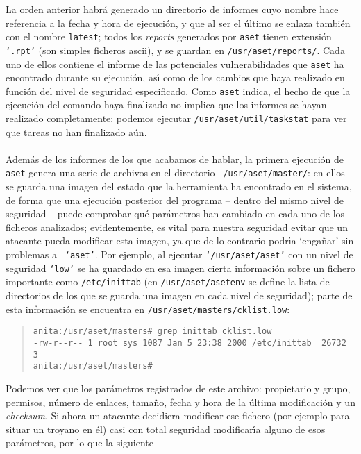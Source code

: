 La orden anterior habr\'a generado un directorio de informes cuyo nombre hace 
referencia a la fecha y hora de ejecuci\'on, y que al ser el \'ultimo se enlaza 
tambi\'en con el nombre {\tt latest}; todos los {\it reports} generados por 
{\tt aset} tienen extensi\'on {\tt `.rpt'} (son simples ficheros {\sc ascii}), 
y se guardan en {\tt /usr/aset/reports/}. Cada uno de ellos contiene el informe 
de las potenciales 
vulnerabilidades que {\tt aset} ha encontrado durante su ejecuci\'on, as\'{\i}
como de los cambios que haya realizado en funci\'on del nivel de seguridad
especificado. Como {\tt aset} indica, el hecho de que la ejecuci\'on del comando
haya finalizado no implica que los informes se hayan realizado completamente;
podemos ejecutar {\tt /usr/aset/util/taskstat} para ver que tareas no han
finalizado a\'un.\\
\\Adem\'as de los informes de los que acabamos de hablar, la primera 
ejecuci\'on de {\tt aset} genera una serie de archivos en el directorio {\tt 
/usr/aset/master/}: en ellos se guarda una imagen del estado que la herramienta
ha encontrado en el sistema, de forma que una ejecuci\'on posterior del 
programa -- dentro del mismo nivel de seguridad -- puede comprobar qu\'e 
par\'ametros han cambiado en cada uno de los ficheros analizados; evidentemente,
es vital para nuestra seguridad evitar que un atacante pueda modificar esta
imagen, ya que de lo contrario podr\'{\i}a `enga\~nar' sin problemas a {\tt 
`aset'}. Por ejemplo,
al ejecutar {\tt `/usr/aset/aset'} con un nivel de seguridad {\tt `low'} se ha 
guardado en esa i\-ma\-gen cierta informaci\'on sobre un fichero importante 
como {\tt /etc/inittab} (en {\tt /usr/aset/asetenv} se define la lista de 
directorios de los que se guarda una imagen en cada nivel de seguridad); parte 
de esta informaci\'on se encuentra en {\tt /usr/aset/masters/cklist.low}:
\begin{quote}
\begin{verbatim}
anita:/usr/aset/masters# grep inittab cklist.low 
-rw-r--r-- 1 root sys 1087 Jan 5 23:38 2000 /etc/inittab  26732 3
anita:/usr/aset/masters# 
\end{verbatim}
\end{quote}
Podemos ver que los par\'ametros registrados de este archivo: propietario y
grupo, permisos, n\'umero de enlaces, tama\~no, fecha y hora de la \'ultima
modificaci\'on y un {\it checksum}. Si ahora un atacante decidiera modificar 
ese fichero (por ejemplo para situar un troyano en \'el) casi con total 
seguridad modificar\'{\i}a alguno de esos par\'ametros, por lo que la siguiente
